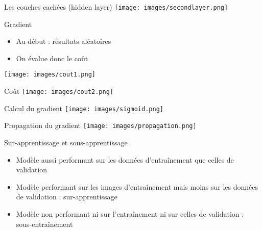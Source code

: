 \documentclass{beamer}
\begin{document}
\begin{frame}{Les couches cachées (hidden layer)}
    \texttt{[image: images/secondlayer.png]}
\end{frame}

\begin{frame}{Gradient}
    \begin{itemize}
        \item Au début : résultats aléatoires
        \item On évalue donc le coût
        
    \end{itemize}
    \texttt{[image: images/cout1.png]}
\end{frame}

\begin{frame}{Coût}
    \texttt{[image: images/cout2.png]}
\end{frame}

\begin{frame}{Calcul du gradient}
    \texttt{[image: images/sigmoid.png]}
\end{frame}


\begin{frame}{Propagation du gradient}
    \texttt{[image: images/propagation.png]}
\end{frame}



\begin{frame}{Sur-apprentissage et sous-apprentissage}
  
  \begin{itemize}
      \item Modèle aussi performant sur les données d'entraînement que celles de validation
      \item Modèle performant sur les images d'entraînement mais moins sur les données de validation : sur-apprentissage 
      \item Modèle non performant ni sur l'entraînement ni sur celles de validation : sous-entraînement
  \end{itemize}
\end{frame}
\end{document}
